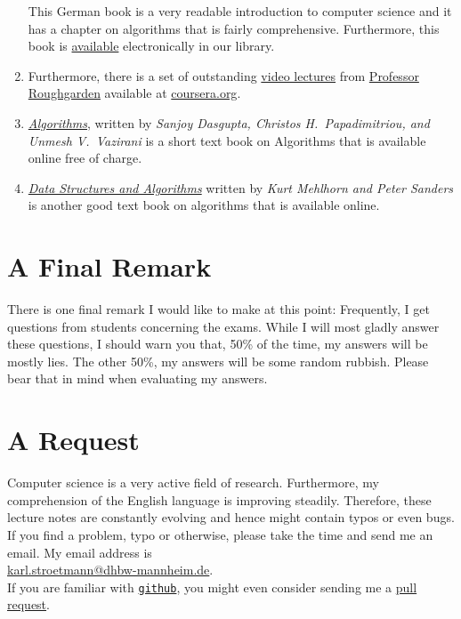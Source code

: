 \begin{enumerate}
      This German book is a very readable introduction to computer science and it has a chapter
      on algorithms that is fairly comprehensive.  Furthermore, this book is
      \href{http://www.oldenbourg-link.com/doi/book/10.1524/9783486595390}{available} electronically
      in our library. 
\item Furthermore, there is a set of outstanding 
      \href{https://class.coursera.org/algo-004/class/index}{video lectures} 
      from \href{http://theory.stanford.edu/~tim/}{Professor Roughgarden}
      available at \href{https://www.coursera.org/}{coursera.org}.
\item \href{http://beust.com/algorithms.pdf}{\emph{Algorithms}},
      written by \textsl{Sanjoy Dasgupta, Christos H.~Papadimitriou, and Unmesh V.~Vazirani} \cite{dasgupta:2008}
      is a short text book on Algorithms that is available online free of charge.
\item \href{http://www.mpi-inf.mpg.de/~mehlhorn/Toolbox.html}{\emph{Data Structures and Algorithms}}
      written by \emph{Kurt Mehlhorn and Peter Sanders} \cite{mehlhorn:2008} is another good text
      book on algorithms that is available online.
\end{enumerate}
\pagebreak

\section{A Final Remark}
There is one final remark I would like to make at this point:  Frequently, I get questions from
students concerning the exams.  While I will most gladly answer these questions, I should warn you
that, 50\%  
of the time, my answers will be mostly lies.  The other 50\%,
my answers will be some random rubbish.  Please bear that in mind when evaluating my answers.

\section{A Request}
Computer science is a very active field of research.  Furthermore, my comprehension of the English
language is improving steadily.  Therefore, these lecture notes are constantly
evolving and hence might contain typos or even bugs.  If you find a problem, typo or otherwise,
please take the time and send me an email.  My email address is
\\[0.2cm]
\hspace*{1.3cm}
\href{mailto:karl.stroetmann@dhbw-mannheim.de}{karl.stroetmann@dhbw-mannheim.de}.
\\[0.2cm]
If you are familiar with \href{http://github.com}{\texttt{github}}, you might even consider
sending me a \href{https://help.github.com/articles/using-pull-requests}{pull request}.

